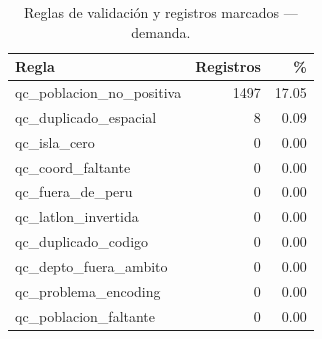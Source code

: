 \begin{table}[htbp]\centering
\caption{Reglas de validaci\'on y registros marcados --- demanda.}\label{tab:calidad-demanda}
\begin{tabular}{lrr}
\toprule
Regla & Registros & \% \\
\midrule
qc\_poblacion\_no\_positiva & 1497 & 17.05 \\
qc\_duplicado\_espacial & 8 & 0.09 \\
qc\_isla\_cero & 0 & 0.00 \\
qc\_coord\_faltante & 0 & 0.00 \\
qc\_fuera\_de\_peru & 0 & 0.00 \\
qc\_latlon\_invertida & 0 & 0.00 \\
qc\_duplicado\_codigo & 0 & 0.00 \\
qc\_depto\_fuera\_ambito & 0 & 0.00 \\
qc\_problema\_encoding & 0 & 0.00 \\
qc\_poblacion\_faltante & 0 & 0.00 \\
\bottomrule
\end{tabular}
\end{table}
